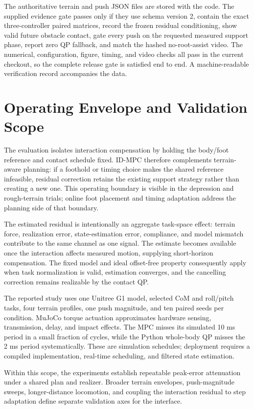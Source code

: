 \documentclass[journal]{IEEEtran}
\theoremstyle{plain}
\theoremstyle{definition}
\begin{document}
The authoritative terrain and push JSON files are stored with the code. The supplied evidence gate passes only if they use schema version 2, contain the exact three-controller paired matrices, record the frozen residual conditioning, show valid future obstacle contact, gate every push on the requested measured support phase, report zero QP fallback, and match the hashed no-root-assist video. The numerical, configuration, figure, timing, and video checks all pass in the current checkout, so the complete release gate is satisfied end to end. A machine-readable verification record accompanies the data.

\section{Operating Envelope and Validation Scope}\label{sec:limitations}

The evaluation isolates interaction compensation by holding the body/foot reference and contact schedule fixed. ID-MPC therefore complements terrain-aware planning: if a foothold or timing choice makes the shared reference infeasible, residual correction retains the existing support strategy rather than creating a new one. This operating boundary is visible in the depression and rough-terrain trials; online foot placement and timing adaptation address the planning side of that boundary.

The estimated residual is intentionally an aggregate task-space effect: terrain force, realization error, state-estimation error, compliance, and model mismatch contribute to the same channel as one signal. The estimate becomes available once the interaction affects measured motion, supplying short-horizon compensation. The fixed model and ideal offset-free property consequently apply when task normalization is valid, estimation converges, and the cancelling correction remains realizable by the contact QP.

The reported study uses one Unitree G1 model, selected CoM and roll/pitch tasks, four terrain profiles, one push magnitude, and ten paired seeds per condition. MuJoCo torque actuation approximates hardware sensing, transmission, delay, and impact effects. The MPC misses its simulated 10 ms period in a small fraction of cycles, while the Python whole-body QP misses the 2 ms period systematically. These are simulation schedules; deployment requires a compiled implementation, real-time scheduling, and filtered state estimation.

Within this scope, the experiments establish repeatable peak-error attenuation under a shared plan and realizer. Broader terrain envelopes, push-magnitude sweeps, longer-distance locomotion, and coupling the interaction residual to step adaptation define separate validation axes for the interface.
\end{document}
